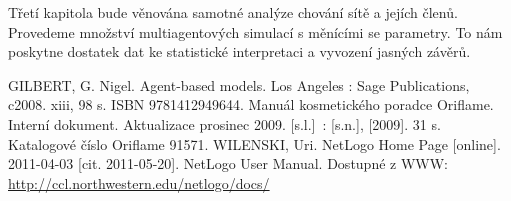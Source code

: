 \documentclass[a4paper,11pt]{report}
\begin{document}
Třetí kapitola bude věnována samotné analýze chování sítě a jejích členů. Provedeme množství multiagentových simulací s měnícími se parametry. To nám poskytne dostatek dat ke statistické interpretaci a vyvození jasných závěrů.
\begin{thebibliography}{9}
GILBERT, G. Nigel. Agent-based models. Los Angeles : Sage Publications,  c2008. xiii, 98 s. ISBN 9781412949644.
 Manuál kosmetického poradce Oriflame. Interní dokument. Aktualizace prosinec 2009. [s.l.]~: [s.n.],  [2009]. 31 s. Katalogové číslo Oriflame 91571.
WILENSKI, Uri. NetLogo Home Page [online]. 2011-04-03 [cit. 2011-05-20].  NetLogo User Manual. Dostupné z WWW: \url{http://ccl.northwestern.edu/netlogo/docs/}
\end{thebibliography}
\end{document}
